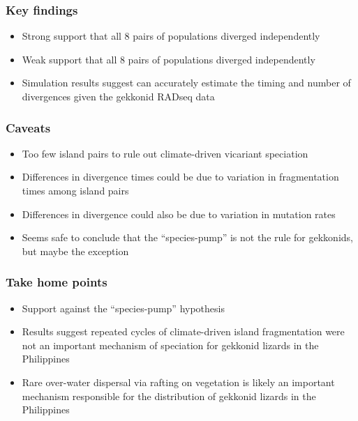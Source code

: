 \begin{frame}
    \frametitle{Key findings}
    \begin{itemize}
        \item<1-> Strong support that all 8 pairs of 
            populations diverged independently
        \item<2-> Weak support that all 8 pairs of  populations
            diverged independently
        \item<3-> Simulation results suggest \ecoevolity can accurately
            estimate the timing and number of divergences given the gekkonid
            RADseq data
    \end{itemize}
\end{frame}

\begin{frame}
    \frametitle{Caveats}
    \begin{itemize}
        \item Too few island pairs to rule out climate-driven vicariant
            speciation
        \item Differences in divergence times could be due to variation in
            fragmentation times among island pairs
        \item Differences in divergence could also be due to variation
            in mutation rates
    \end{itemize}

    \vspace{1cm}
    \begin{itemize}
        \item<2-> Seems safe to conclude that the ``species-pump'' is not the
            rule for gekkonids, but maybe the exception
    \end{itemize}
\end{frame}

\begin{frame}
    \frametitle{Take home points}
    \begin{itemize}
        \item<1-> Support against the ``species-pump'' hypothesis
        \item<2-> Results suggest repeated cycles of climate-driven island
            fragmentation were not an important mechanism of speciation for
            gekkonid lizards in the Philippines
        \item<3-> Rare over-water dispersal via rafting on vegetation is likely
            an important mechanism responsible for the distribution of gekkonid
            lizards in the Philippines
    \end{itemize}
\end{frame}

